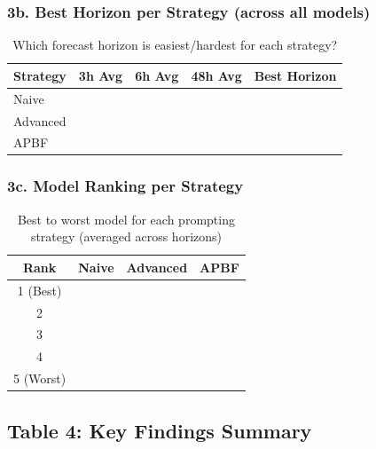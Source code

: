 \documentclass{article}
\begin{document}
\subsubsection*{3b. Best Horizon per Strategy (across all models)}

\begin{table}[h!]
\centering
\caption{Which forecast horizon is easiest/hardest for each strategy?}
\begin{tabular}{l|ccc|l}
\toprule
\textbf{Strategy} & \textbf{3h Avg} & \textbf{6h Avg} & \textbf{48h Avg} & \textbf{Best Horizon} \\
\midrule
Naive & & & & \\
Advanced & & & & \\
APBF & & & & \\
\bottomrule
\end{tabular}
\end{table}

\subsubsection*{3c. Model Ranking per Strategy}

\begin{table}[h!]
\centering
\caption{Best to worst model for each prompting strategy (averaged across horizons)}
\begin{tabular}{c|l|l|l}
\toprule
\textbf{Rank} & \textbf{Naive} & \textbf{Advanced} & \textbf{APBF} \\
\midrule
1 (Best) & & & \\
2 & & & \\
3 & & & \\
4 & & & \\
5 (Worst) & & & \\
\bottomrule
\end{tabular}
\end{table}

\clearpage

\subsection*{Table 4: Key Findings Summary}
\end{document}
